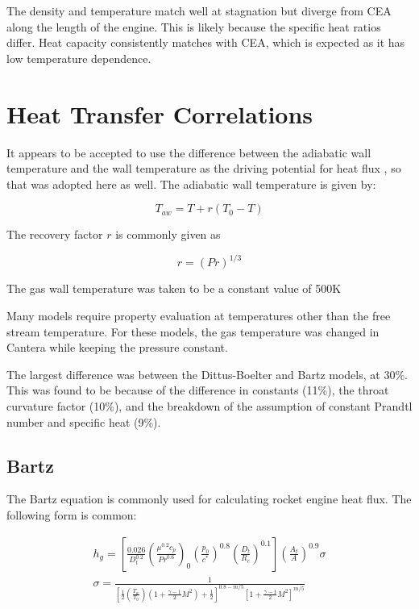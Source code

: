 \documentclass[11pt]{article}
\begin{document}
The density and temperature match well at stagnation but diverge from CEA along the length of the engine. This is likely because the specific heat ratios differ. Heat capacity consistently matches with CEA, which is expected as it has low temperature dependence.

\section{Heat Transfer Correlations}

It appears to be accepted to use the difference between the adiabatic wall temperature and the wall temperature as the driving potential for heat flux \cite{}, so that was adopted here as well. The adiabatic wall temperature is given by:

\begin{equation}
    T_{aw} = T + r(T_0 - T)
\end{equation}

The recovery factor $r$ is commonly given as

\begin{equation}
    r = (Pr)^{1/3}
\end{equation}

The gas wall temperature was taken to be a constant value of 500K %

Many models require property evaluation at temperatures other than the free stream temperature. For these models, the gas temperature was changed in Cantera while keeping the pressure constant.


The largest difference was between the Dittus-Boelter and Bartz models, at 30\%. This was found to be because of the difference in constants (11\%), the throat curvature factor (10\%), and the breakdown of the assumption of constant Prandtl number and specific heat (9\%).

\subsection{Bartz}


The Bartz equation is commonly used for calculating rocket engine heat flux. The following form is common:

\begin{equation}
    \label{equation:bartz}
    \begin{split}
         h_g = \left[ \frac{0.026}{D_t^{0.2}} \left( \frac{\mu^{0.2} c_p}{{Pr}^{0.6}} \right)_{0} \left( \frac{p_0}{c^*} \right)^{0.8} \left( \frac{D_t}{R_c} \right)^{0.1} \right] \left( \frac{A_t}{A} \right)^{0.9} \sigma \\
         \sigma = \frac{1}{\left[ \frac{1}{2} \left( \frac{T_{w}}{T_0} \right) \left( 1 + \frac{\gamma - 1}{2} M^2 \right) + \frac{1}{2}\right]^{0.8-m/5} \left[ 1 + \frac{\gamma - 1}{2} M^2 \right]^{m/5}}
    \end{split}
\end{equation}
\end{document}
